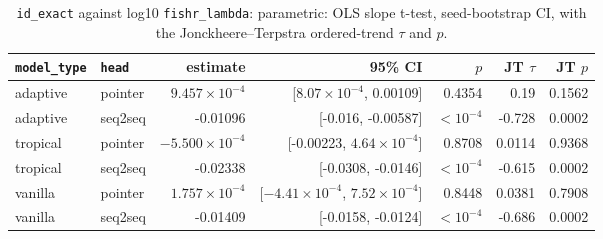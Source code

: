 \documentclass[10pt]{article}
\begin{document}
{\small
\begin{longtable}{llrrrrr}
\caption{\texttt{id\_exact} against log10 \texttt{fishr\_lambda}: parametric: OLS slope t-test, seed-bootstrap CI, with the Jonckheere--Terpstra ordered-trend $\tau$ and $p$.}\label{tab:trend-id_exact}\\
\toprule
\texttt{model\_type} & \texttt{head} & estimate & 95\% CI & $p$ & JT $\tau$ & JT $p$\\
\midrule
\endhead
adaptive & pointer & $9.457\times10^{-4}$ & [$8.07\times10^{-4}$, 0.00109] & 0.4354 & 0.19 & 0.1562\\
adaptive & seq2seq & -0.01096 & [-0.016, -0.00587] & $<10^{-4}$ & -0.728 & 0.0002\\
tropical & pointer & $-5.500\times10^{-4}$ & [-0.00223, $4.64\times10^{-4}$] & 0.8708 & 0.0114 & 0.9368\\
tropical & seq2seq & -0.02338 & [-0.0308, -0.0146] & $<10^{-4}$ & -0.615 & 0.0002\\
vanilla & pointer & $1.757\times10^{-4}$ & [$-4.41\times10^{-4}$, $7.52\times10^{-4}$] & 0.8448 & 0.0381 & 0.7908\\
vanilla & seq2seq & -0.01409 & [-0.0158, -0.0124] & $<10^{-4}$ & -0.686 & 0.0002\\
\bottomrule
\end{longtable}
}
\end{document}
